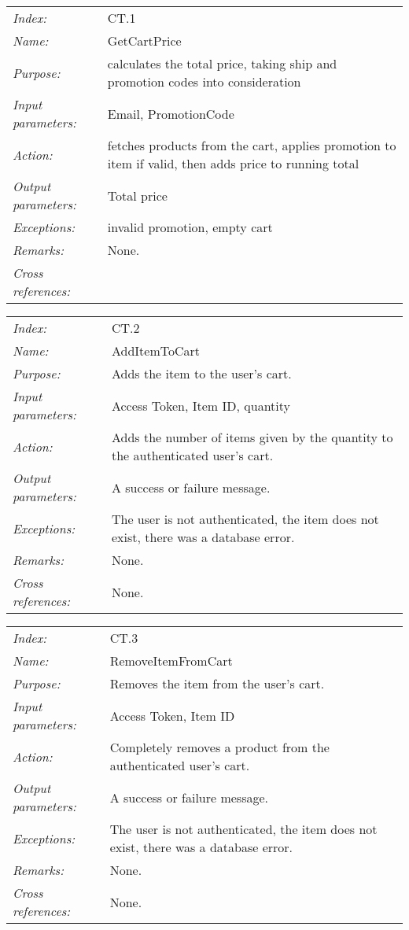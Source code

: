 \documentclass[10pt,letter]{article}
\begin{document}
\begin{tabularx}{\textwidth}{l X}
    \it{Index:} & CT.1 \\
    \it{Name:} & GetCartPrice \\
    \it{Purpose:} & calculates the total price, taking ship and promotion codes into consideration \\
    \it{Input parameters:} & Email, PromotionCode \\
    \it{Action:} &  fetches products from the cart, applies promotion to item if valid, then adds price to running total\\
    \it{Output parameters:} & Total price  \\
    \it{Exceptions:} &  invalid promotion, empty cart\\
    \it{Remarks:} & None. \\
    \it{Cross references:} & \\
    \hline
\end{tabularx}


\begin{tabularx}{\textwidth}{l X}
    \it{Index:} & CT.2 \\
    \it{Name:} & AddItemToCart \\
    \it{Purpose:} & Adds the item to the user's cart. \\
    \it{Input parameters:} & Access Token, Item ID, quantity \\
    \it{Action:} & Adds the number of items given by the quantity to the authenticated user's cart. \\
    \it{Output parameters:} & A success or failure message. \\
    \it{Exceptions:} & The user is not authenticated, the item does not exist, there was a database error. \\
    \it{Remarks:} & None. \\
    \it{Cross references:} & None. \\
    \hline
\end{tabularx}

\begin{tabularx}{\textwidth}{l X}
    \it{Index:} & CT.3 \\
    \it{Name:} & RemoveItemFromCart \\
    \it{Purpose:} & Removes the item from the user's cart. \\
    \it{Input parameters:} & Access Token, Item ID \\
    \it{Action:} & Completely removes a product from the authenticated user's cart. \\
    \it{Output parameters:} & A success or failure message. \\
    \it{Exceptions:} & The user is not authenticated, the item does not exist, there was a database error. \\
    \it{Remarks:} & None. \\
    \it{Cross references:} & None. \\
    \hline
\end{tabularx}
\end{document}
